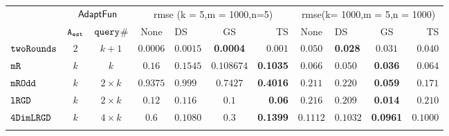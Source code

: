 {\begin {table}[t]
\begin{center}
{\begin{tabular}{|| >{\tiny}l || c | c || c | l | c | r || c | l | c | r || }
        & \multicolumn{2}{c||}{$\textsf{AdaptFun}$}
        & \multicolumn{4}{c||}{rmse (k = 5,m = 1000,n=5)}  & \multicolumn{4}{c||}{rmse(k= 1000,m = 5,n = 1000)}  \\ 
        \hhline{||~--||----||----||}
        & {${\mathtt{A_{est}}}$ } & {${\tt query}$\# }  & None  & DS & GS & TS & None & DS & GS & TS \\ 
        \hline \hline
       $  \mathtt{ twoRounds }$ & $ 2 $ & $  k + 1 $  & $0.0006$   & {{$0.0015$}} & \textbf{0.0004} & {$0.001$}& $0.050$   & {\textbf{0.028}} & {$0.031$} & $0.040$  \\
       \hhline{||-||---||-||--||----||}
        $  \mathtt{ mR}$ & $k$ & $k$  & $0.16$   & $0.1545$  & $0.108674 $ & \textbf{0.1035}  & $0.066$   & $0.050$ & {\textbf{0.036}} & $0.064$  \\
        \hhline{||-||---||-||--||----||}
        $  \mathtt{ mROdd }$ & $ k $   & $  2 \times k $ & $0.9375$   & $0.999$ & $0.7427$ & {\textbf{0.4016}} & $0.211$   & $0.220$ & {\textbf{0.059}} & $0.171$  \\
        \hhline{||-||---||-||--||----||}
        $  \mathtt{ lRGD }$ & $ k $ & $  2\times k $  & $0.12$   & $0.116$ & $ 0.1 $ & \textbf{0.06} & $0.216$   & $0.209$ & \textbf{0.014} & $0.210$  \\
        \hhline{||-||---||-||--||----||}
        $  \mathtt{ 4DimLRGD }$ & $ k $ & $  4\times k $   & $0.6$   & $0.1080$ & $0.3 $ & \textbf{0.1399} & $0.1112$   & $0.1032$ & \textbf{0.0961} & $0.1000$  \\
        \hhline{||-||---||-||--||----||}

\end{tabular}}
\end{center}
\end{table}}
